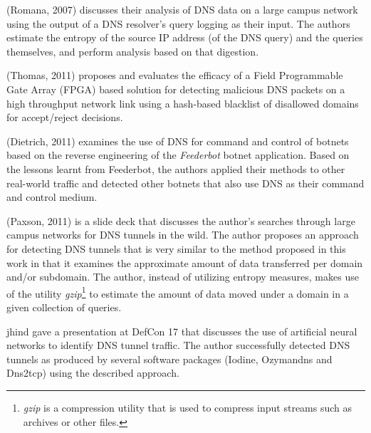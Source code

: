 \documentclass{llncs}
\begin{document}
(Romana, 2007)\cite{Romana2007} discusses their analysis of DNS data on a large
campus network using the output of a DNS resolver's query logging as their
input. 
The authors
estimate the entropy of the source IP address (of the DNS query) and the queries
themselves, and perform analysis based on that digestion.

(Thomas, 2011)\cite{Thomas2011} proposes and evaluates the efficacy of a Field
Programmable Gate Array (FPGA) based solution for detecting malicious DNS
packets on a high throughput network link using a hash-based blacklist of disallowed
domains for accept/reject decisions.

(Dietrich, 2011)\cite{Dietrich2011} examines the use of DNS for command and
control of botnets based on the reverse engineering of the \emph{Feederbot}
botnet application. Based on the lessons learnt from Feederbot, the authors
applied their methods to other real-world traffic and detected other botnets
that also use DNS as their command and control medium.

(Paxson, 2011)\cite{Paxson2011} is a slide deck that discusses the author's
searches through large campus networks for DNS tunnels in the wild. The author
proposes an approach for detecting DNS tunnels that is very similar to the
method proposed in this work in that it examines the approximate amount of data
transferred per domain and/or subdomain. The author, instead of utilizing
entropy measures, makes use of the utility \emph{gzip}\footnote{\emph{gzip} is a
compression utility that is used to compress input streams such as archives or
other files.} to estimate the amount of data moved under a domain in a given
collection of queries.

jhind\cite{jhind2009} gave a presentation at DefCon 17 that discusses the use of
artificial neural networks to identify DNS tunnel traffic.
 The author successfully detected DNS tunnels as
produced by several software packages (Iodine, Ozymandns and Dns2tcp) using the
described approach.
\end{document}
